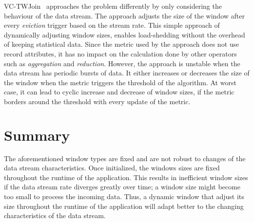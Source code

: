 VC-TWJoin~\cite{vctw_join} approaches the problem differently by only considering 
the behaviour of the data stream. The approach adjusts the size of the window 
after every \emph{eviction} trigger based on the stream rate. This simple approach 
of dynamically adjusting window sizes, enables load-shedding without the overhead of 
keeping statistical data. Since the metric used by the approach does not use 
record attributes, it has no impact on the calculation 
done by other operators such as \emph{aggregation} and \emph{reduction}.
However, the approach is unstable when the data stream has periodic bursts of data.
It either increases or decreases the size of the window when the metric triggers 
the threshold of the algorithm. At worst case, it can lead to cyclic increase and 
decrease of window sizes, if the metric borders around the threshold with every 
update of the metric.


\section{Summary}%
\label{sec:Summary}

The aforementioned window types are fixed and are not robust to changes of the data stream characteristics. Once initialized, the windows sizes 
are fixed throughout the runtime of the application. This results in inefficient 
window sizes if the data stream rate diverges greatly over time; a window size might become too small to process the incoming 
data. Thus, a dynamic window that adjust its size throughout the runtime of the application 
will adapt better to the changing characteristics of the data stream. 


